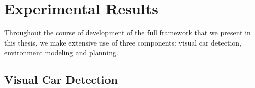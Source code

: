 
\chapter{Experimental Results}\label{cha:experimental_results}     Throughout
the course of development of the full framework that we present in this
thesis, we make extensive use of three components: visual car detection,
environment modeling and planning.

\section{Visual Car Detection}\label{sec:visual_car_detection}
\begin{figure}[p]%
\centering
{}
\\

\end{figure}
